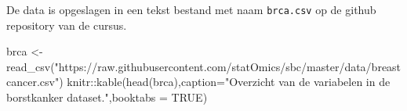 \documentclass[
  dutch,
  letterpaper,
  12pt]{book}
\newenvironment{Shaded}{\begin{snugshade}}{\end{snugshade}}
\newcommand{\AttributeTok}[1]{\textcolor[rgb]{0.40,0.45,0.13}{#1}}
\newcommand{\ConstantTok}[1]{\textcolor[rgb]{0.56,0.35,0.01}{#1}}
\newcommand{\FunctionTok}[1]{\textcolor[rgb]{0.28,0.35,0.67}{#1}}
\newcommand{\NormalTok}[1]{\textcolor[rgb]{0.00,0.23,0.31}{#1}}
\newcommand{\OtherTok}[1]{\textcolor[rgb]{0.00,0.23,0.31}{#1}}
\newcommand{\SpecialCharTok}[1]{\textcolor[rgb]{0.37,0.37,0.37}{#1}}
\newcommand{\StringTok}[1]{\textcolor[rgb]{0.13,0.47,0.30}{#1}}
\theoremstyle{definition}
\theoremstyle{definition}
\theoremstyle{definition}
\theoremstyle{remark}
\begin{document}
De data is opgeslagen in een tekst bestand met naam \texttt{brca.csv} op
de github repository van de cursus.

\begin{Shaded}
\begin{Highlighting}[]
\NormalTok{brca }\OtherTok{\textless{}{-}} \FunctionTok{read\_csv}\NormalTok{(}\StringTok{"https://raw.githubusercontent.com/statOmics/sbc/master/data/breastcancer.csv"}\NormalTok{)}
\NormalTok{knitr}\SpecialCharTok{::}\FunctionTok{kable}\NormalTok{(}\FunctionTok{head}\NormalTok{(brca),}\AttributeTok{caption=}\StringTok{"Overzicht van de variabelen in de borstkanker dataset."}\NormalTok{,}\AttributeTok{booktabs =} \ConstantTok{TRUE}\NormalTok{)}
\end{Highlighting}
\end{Shaded}
\end{document}
